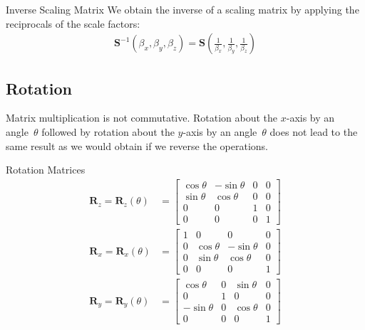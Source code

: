 \documentclass[../COS3712_Notes.tex]{subfiles}
\begin{document}
        \begin{theorem}{Inverse Scaling Matrix}
          We obtain the inverse of a scaling matrix by applying the reciprocals of the scale factors:
          \begin{align*}
            \mathbf{S}^{-1}(\beta_x, \beta_y, \beta_z)
            = \mathbf{S}\left(\frac{1}{\beta_x}, \frac{1}{\beta_y}, \frac{1}{\beta_z}\right)
          \end{align*}
        \end{theorem}

      \subsection{Rotation}
        Matrix multiplication is not commutative.
        Rotation about the $x$-axis by an angle~$\theta$ followed by rotation about the $y$-axis
        by an angle~$\theta$ does not lead to the same result as we would obtain if we reverse
        the operations.

        \begin{theorem}{Rotation Matrices}
          \begin{align*}
            \mathbf{R}_z = \mathbf{R}_z(\theta) &= \begin{bmatrix}
              \cos\theta & -\sin\theta & 0 & 0 \\
              \sin\theta & \cos\theta & 0 & 0 \\
              0 & 0 & 1 & 0 \\
              0 & 0 & 0 & 1
            \end{bmatrix}\\
            \mathbf{R}_x = \mathbf{R}_x(\theta) &= \begin{bmatrix}
              1 & 0 & 0 & 0 \\
              0 & \cos\theta & -\sin\theta & 0 \\
              0 & \sin\theta & \cos\theta & 0 \\
              0 & 0 & 0 & 1
            \end{bmatrix}\\
            \mathbf{R}_y = \mathbf{R}_y(\theta) &= \begin{bmatrix}
              \cos\theta & 0 & \sin\theta & 0\\
              0 & 1 & 0 & 0\\
              -\sin\theta & 0 & \cos\theta & 0\\
              0 & 0 & 0 & 1
            \end{bmatrix}
          \end{align*}
        \end{theorem}
\end{document}
